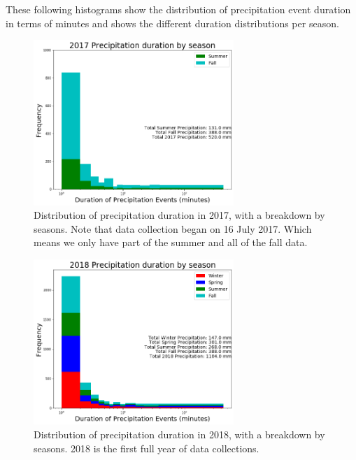 \documentclass[11pt]{report}
\begin{document}
These following histograms show the distribution of precipitation event
duration in terms of minutes and shows the different duration distributions
per season.

\clearpage
\begin{figure}[t]
	\centering
	\includegraphics[width=0.675\textwidth]{Figures/precip_2017.png}
	\caption[Precipitation histogram for 2017 broken down by
	season]{\label{p2017} Distribution of precipitation duration in
		2017, with a breakdown by seasons. Note that data collection began on 16 July
		2017. Which means we only have part of the summer and all of the fall data. }
\end{figure}
\begin{figure}[b]
	\centering
	\includegraphics[width=0.675\textwidth]{Figures/precip_2018.png}
	\caption[Precipitation histogram for 2018 broken down by season]{\label{p2018}
		Distribution of precipitation duration in 2018, with a breakdown
		by seasons. 2018 is the first full year of data collections.}
\end{figure}
\end{document}
